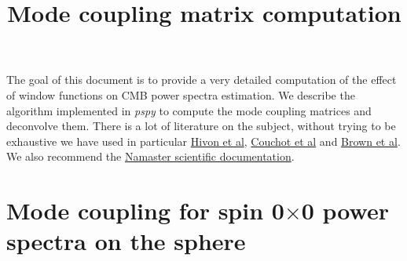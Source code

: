 \documentclass[a4paper, 11pt]{article}
\begin{document}
\title{\textbf{Mode coupling matrix computation}}
\maketitle

The goal of this document is to provide a very detailed computation of the effect of window functions on CMB power spectra estimation. We describe the algorithm implemented in {\it pspy} to compute the mode coupling matrices and deconvolve them. There is a lot of literature on the subject, without trying to be exhaustive we have used in particular  \href{https://arxiv.org/pdf/astro-ph/0105302.pdf}{Hivon et al}, \href{https://arxiv.org/abs/1609.09730}{Couchot et al} and \href{https://arxiv.org/abs/astro-ph/0410394}{Brown et al}. We also recommend the \href{https://github.com/LSSTDESC/NaMaster/blob/master/doc/doc_scientific.pdf}{Namaster scientific documentation}. 



\section{Mode coupling for spin 0$\times$0 power spectra on the sphere}
\end{document}
